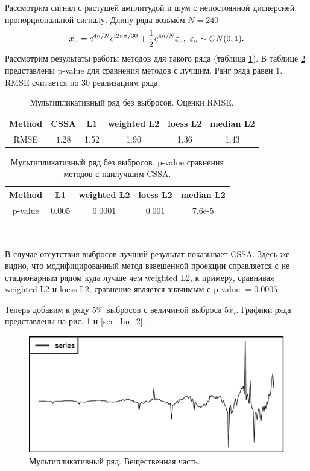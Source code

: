 \documentclass[specialist,
               substylefile = spbu.rtx,
               subf,href,colorlinks=true, 12pt]{disser}
\begin{document}
Рассмотрим сигнал с растущей амплитудой и шум с непостоянной дисперсией, пропорциональной сигналу.
Длину ряда возьмём $N = 240$
$$x_n = e^{4n/N} e^{\mathrm{i}\mkern1mu 2n\pi/30} + \frac{1}{2}e^{4n/N} \varepsilon_n, ~ \varepsilon_n \sim CN(0,1).$$
Рассмотрим результаты работы методов для такого ряда (таблица \ref{tab3}).  В таблице \ref{tab: pval3} представлены p-value для сравнения методов с лучшим. Ранг ряда равен 1. RMSE считается по 30 реализациям ряда.

\begin{table}[H]
	\begin{center}
		\caption{Мультипликативный ряд без выбросов. Оценки RMSE.}
		\label{tab3}
		\begin{tabular}{|c|c|c|c|c|c|}
			\hline
			Method 	& CSSA & L1 & weighted L2 & loess L2 & median L2 \\
			\hline
			RMSE & $\mathbf{1.28}$  & 1.52  & 1.90 & 1.36 & 1.43\\
			\hline
		\end{tabular}
	\end{center}
\end{table}

\begin{table}[H]
	\caption{Мультипликативный ряд без выбросов. p-value сравнения методов с наилучшим CSSA.}
	\label{tab: pval3}
	\begin{center}
		\begin{tabular}{|c|c|c|c|c|}
			\hline
			Method & L1 & weighted L2 & loess L2 & median L2 \\
			\hline
			p-value & 0.005   & 0.0001 & 0.001  & 7.6e-5 \\
			\hline
		\end{tabular} \\
	\end{center}
\end{table}

В случае отсутствия выбросов лучший результат показывает CSSA. Здесь же видно, что модифицированный метод взвешенной проекции справляется с не стационарным рядом куда лучше чем weighted L2, к примеру, сравнивая weighted L2 и loess L2, сравнение является значимым с p-value $ = 0.0005$.

Теперь добавим к ряду $5\%$ выбросов с величиной выброса $5x_i$. Графики ряда представлены на рис. \ref{ser_Re_2} и \ref{ser_Im_2}.

\begin{figure}[H]
	\begin{center}
		\includegraphics[width=0.67\linewidth]{img/ser_2_Re.png}
		\caption{Мультипликативный ряд. Вещественная часть.}
		\label{ser_Re_2}
	\end{center}
\end{figure}
\end{document}

